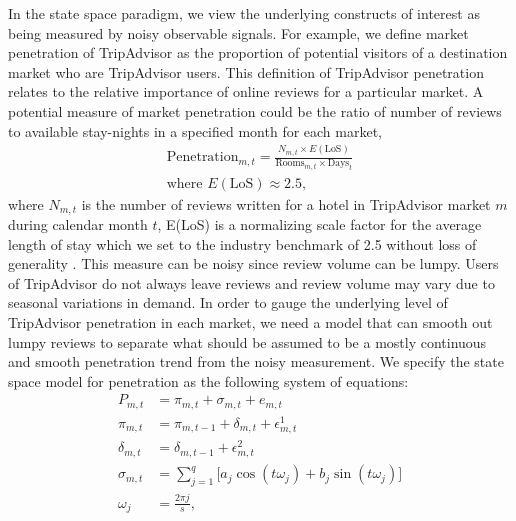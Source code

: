 \documentclass{informs_mod} %
\begin{document}
In the state space paradigm, we view the underlying constructs of interest as being measured by noisy observable signals. For example, we define market penetration of TripAdvisor as the proportion of potential visitors of a destination market who are TripAdvisor users. This definition of TripAdvisor penetration relates to the relative importance of online reviews for a particular market. A potential measure of market penetration could be the ratio of number of reviews to available stay-nights in a specified month for each market,
\begin{equation}\label{eq:penetration}
\begin{split}
\text{Penetration}_{m,t}=\frac{N_{m,t}\times E({\text{LoS}})}{\text{Rooms}_{m,t}\times \text{Days}_t} \\
\text{where } E({\text{LoS}})\approx 2.5,
\end{split}
\end{equation}
where $N_{m,t}$ is the number of reviews written for a hotel in TripAdvisor market $m$ during calendar month $t$, E(LoS) is a normalizing scale factor for the average length of stay which we set to the industry benchmark of 2.5 without loss of generality \citep{expediapackage2017}. This measure can be noisy since review volume can be lumpy. Users of TripAdvisor do not always leave reviews and review volume may vary due to seasonal variations in demand. In order to gauge the underlying level of TripAdvisor penetration in each market, we need a model that can smooth out lumpy reviews to separate what should be assumed to be a mostly continuous and smooth penetration trend from the noisy measurement. We specify the state space model for penetration as the following system of equations:
\begin{equation}\label{eq:penetration_dlm}
\begin{split}
P_{m,t}&=\pi_{m,t}+\sigma_{m,t}+e_{m,t}\\
\pi_{m,t}&=\pi_{m,t-1}+\delta_{m,t}+\epsilon_{m,t}^{1} \\
\delta_{m,t} &= \delta_{m,t-1} +\epsilon_{m,t}^{2} \\
\sigma_{m,t} &= \sum_{j=1}^{q}\big[a_j\cos(t\omega_j)+b_j\sin(t\omega_j)\big] \\
\omega_j &= \frac{2\pi j}{s},
\end{split}
\end{equation}
\end{document}
